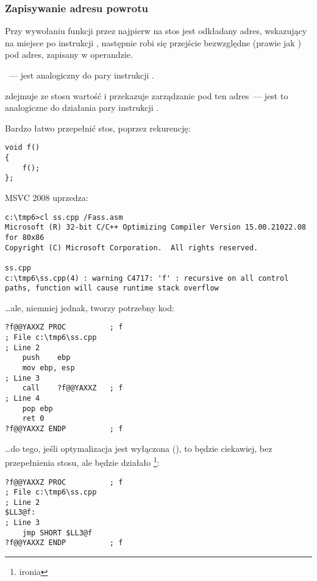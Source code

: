 \subsubsection{Zapisywanie adresu powrotu}


Przy wywołaniu funkcji przez \CALL najpierw na stos jest odkładany adres, wskazujący na miejsce po 
instrukcji \CALL, następnie robi się przejście bezwzględne (prawie jak ) pod adres, zapisany w operandzie.

\CALL~--- jest analogiczny do pary instrukcji .

\RET zdejmuje ze stosu wartość i przekazuje zarządzanie pod ten adres~--- 
jest to analogiczne do działania pary instrukcji .

\myindex{\Stack!\MLStackOverflow}
\myindex{\Recursion}
Bardzo łatwo przepełnić stos, poprzez rekurencję:

\begin{lstlisting}[style=customc]
void f()
{
	f();
};
\end{lstlisting}

MSVC 2008 uprzedza:

\begin{lstlisting}
c:\tmp6>cl ss.cpp /Fass.asm
Microsoft (R) 32-bit C/C++ Optimizing Compiler Version 15.00.21022.08 for 80x86
Copyright (C) Microsoft Corporation.  All rights reserved.

ss.cpp
c:\tmp6\ss.cpp(4) : warning C4717: 'f' : recursive on all control paths, function will cause runtime stack overflow
\end{lstlisting}

\dots ale, niemniej jednak, tworzy potrzebny kod:

\begin{lstlisting}[style=customasmx86]
?f@@YAXXZ PROC			; f
; File c:\tmp6\ss.cpp
; Line 2
	push	ebp
	mov	ebp, esp
; Line 3
	call	?f@@YAXXZ	; f
; Line 4
	pop	ebp
	ret	0
?f@@YAXXZ ENDP			; f
\end{lstlisting}

\dots do tego, jeśli optymalizacja jest wyłączona (\TT{\Ox}), to będzie ciekawiej, bez przepełnienia stosu, 
ale będzie działało \footnote{ironia}:

\begin{lstlisting}[style=customasmx86]
?f@@YAXXZ PROC			; f
; File c:\tmp6\ss.cpp
; Line 2
$LL3@f:
; Line 3
	jmp	SHORT $LL3@f
?f@@YAXXZ ENDP			; f
\end{lstlisting}

